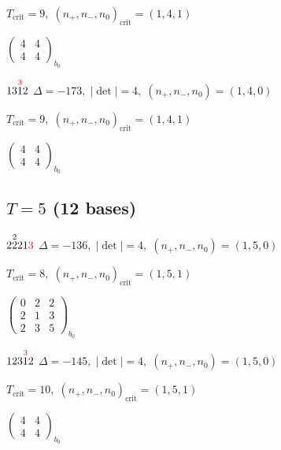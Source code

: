 \documentclass[10pt]{article}
\begin{document}
\hspace{1em}$T_{\text{crit}}=9,\; (n_+,n_-,n_0)_{\text{crit}}=(1,4,1)$

\hspace{2em}$\left(\begin{smallmatrix}4 & 4 \\ 4 & 4\end{smallmatrix}\right)_{\!b_0}$

\smallskip

$13\overset{\textcolor{red}{3}}{1}2$ \quad $\Delta=-173,\; |\det|=4,\; (n_+,n_-,n_0)=(1,4,0)$

\hspace{1em}$T_{\text{crit}}=9,\; (n_+,n_-,n_0)_{\text{crit}}=(1,4,1)$

\hspace{2em}$\left(\begin{smallmatrix}4 & 4 \\ 4 & 4\end{smallmatrix}\right)_{\!b_0}$


\subsection*{$T = 5$ \quad (12 bases)}
\smallskip

$2\overset{2}{2}21\textcolor{red}{3}$ \quad $\Delta=-136,\; |\det|=4,\; (n_+,n_-,n_0)=(1,5,0)$

\hspace{1em}$T_{\text{crit}}=8,\; (n_+,n_-,n_0)_{\text{crit}}=(1,5,1)$

\hspace{2em}$\left(\begin{smallmatrix}0 & 2 & 2 \\ 2 & 1 & 3 \\ 2 & 3 & 5\end{smallmatrix}\right)_{\!b_0}$

\smallskip

$123\overset{\textcolor{red}{3}}{1}2$ \quad $\Delta=-145,\; |\det|=4,\; (n_+,n_-,n_0)=(1,5,0)$

\hspace{1em}$T_{\text{crit}}=10,\; (n_+,n_-,n_0)_{\text{crit}}=(1,5,1)$

\hspace{2em}$\left(\begin{smallmatrix}4 & 4 \\ 4 & 4\end{smallmatrix}\right)_{\!b_0}$
\end{document}
